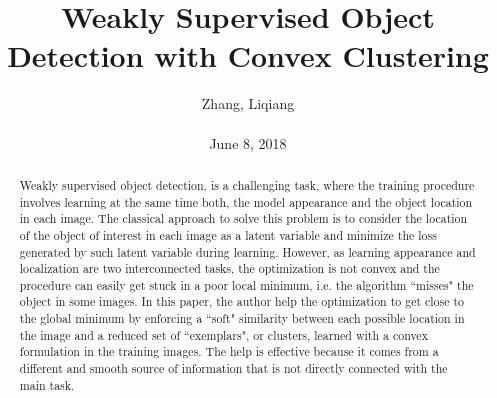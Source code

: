\documentclass[10pt,twocolumn,letterpaper]{article}
\title{\textbf{Weakly Supervised Object Detection with Convex Clustering}}
\author{Zhang, Liqiang\\\\June 8, 2018}
\begin{document}
\maketitle
\par
\begin{abstract}
  Weakly supervised object detection, is a challenging task, where the training procedure involves learning at the same time both, the model appearance and the object location in each image. The classical approach to solve this problem is to consider the location of the object of interest in each image as a latent variable and minimize the loss generated by such latent variable during learning. However, as learning appearance and localization are two interconnected tasks, the optimization is not convex and the procedure can easily get stuck in a poor local minimum, i.e. the algorithm ``misses" the object in some images. In this paper, the author help the optimization to get close to the global minimum by enforcing a ``soft" similarity between each possible location in the image and a reduced set of ``exemplars", or clusters, learned with a convex formulation in the training images. The help is effective because it comes from a different and smooth source of information that is not directly connected with the main task.
\end{abstract}
\end{document}
